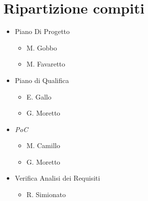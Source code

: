 \documentclass[5pt]{article}
\begin{document}
\section{Ripartizione compiti}
\begin{itemize}
    \item Piano Di Progetto
    \begin{itemize}
        \item M. Gobbo
        \item M. Favaretto
    \end{itemize}
    \item Piano di Qualifica
    \begin{itemize}
        \item E. Gallo
        \item G. Moretto
    \end{itemize}
    \item \textit{PoC}
    \begin{itemize}
        \item M. Camillo
        \item G. Moretto
    \end{itemize}
    \item Verifica Analisi dei Requisiti
    \begin{itemize}
        \item R. Simionato
    \end{itemize}
\end{itemize}
\end{document}
